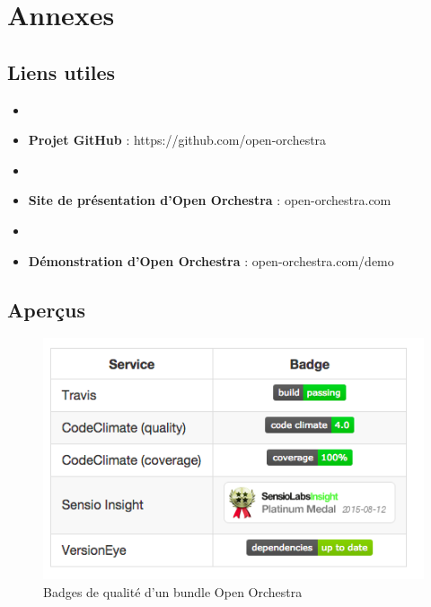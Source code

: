 \chapter*{Annexes}
\section*{Liens utiles}
\begin{itemize}
\item[]
\item \textbf{Projet GitHub} : https://github.com/open-orchestra
\item[]
\item \textbf{Site de présentation d'Open Orchestra} : open-orchestra.com
\item[]
\item \textbf{Démonstration d'Open Orchestra} : open-orchestra.com/demo
\end{itemize}
\section{Aperçus}


    \begin{figure}[H]
        \begin{center}
          \includegraphics[scale=0.75]{images/annexe_note}
        \end{center}
        \caption{Badges de qualité d'un bundle Open Orchestra}
        \label{annexe_note}
      \end{figure}
      

